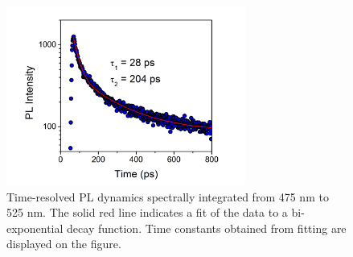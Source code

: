 \begin{figure}
\begin{center}
\includegraphics[width=0.7\textwidth]{./appendixC/siaddl3.png}
\caption[Picosecond PL dynamics over the 0 - 800 ps.]{Time-resolved PL dynamics spectrally integrated from 475 nm to 525 nm. The solid red line indicates a fit of the data to a bi-exponential decay function. Time constants obtained from fitting are displayed on the figure.}
\label{f:siaddl3}
\end{center}
\end{figure}

